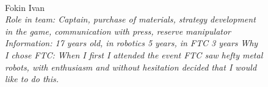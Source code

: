 \begin{figure}[H]
	\begin{minipage}[h]{0.47\linewidth}
		\\
		Fokin Ivan\\
		\emph{Role in team: Captain, purchase of materials, strategy development in the game, communication with press, reserve  manipulator }
		\emph{Information: 17 years old, in robotics 5 years, in FTC 3 years } 
		\emph{Why I chose FTC: When I first I attended the event FTC saw hefty metal robots, with enthusiasm and without hesitation decided that I would like to do this.}
	\end{minipage}
	\hfill
	\begin{minipage}[h]{0.47\linewidth}

\end{minipage}
\end{figure}
